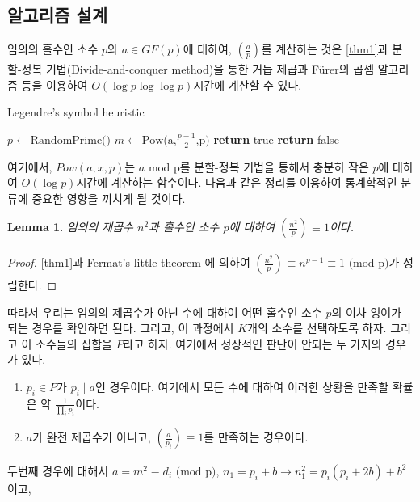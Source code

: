 \documentclass[a4paper]{article}
\newcommand{\Leg}[3][]{\left(\frac{#2}{#3}\right)_{#1}}
\newtheorem{lemma}{Lemma}
\begin{document}
    \subsection{알고리즘 설계}
        임의의 홀수인 소수 $p$와 $a \in GF(p)$에 대하여, $\Leg{a}{p}$를 계산하는 것은 \cref{thm1}과 분할-정복 기법(Divide-and-conquer method)을 통한 거듭 제곱과 Fürer의 곱셈 알고리즘 등을 이용하여 $O(\log{p}\log{\log{p}})$시간에 계산할 수 있다.
        \begin{algorithm}
            \caption{Legendre's symbol heuristic}\label{algo1}
            \begin{algorithmic}
                \State $p \gets \text{RandomPrime()}$
                \State $m \gets \text{Pow(a,$\frac{p-1}{2}$,p)}$
                    \State \textbf{return} true
                \Else
                    \State \textbf{return} false
                \EndIf
            \end{algorithmic}
        \end{algorithm}
        여기에서, $Pow(a,x,p)$는 $a \text{ mod p}$를 분할-정복 기법을 통해서 충분히 작은 $p$에 대하여 $O(\log{p})$시간에 계산하는 함수이다.
        다음과 같은 정리를 이용하여 통계학적인 분류에 중요한 영향을 끼치게 될 것이다.
        \begin{lemma}
            임의의 제곱수 $n^{2}$과 홀수인 소수 $p$에 대하여 $\Leg{n^{2}}{p} \equiv 1$이다.
        \end{lemma}
        \begin{proof}
            \cref{thm1}과 Fermat's little theorem \cite{hardy_heath-brown_wright_2011}에 의하여 $\Leg{n^{2}}{p}\equiv n^{p-1} \equiv 1 \text{ (mod p)}$가 성립한다.
        \end{proof}
        따라서 우리는 임의의 제곱수가 아닌 수에 대하여 어떤 홀수인 소수 $p$의 이차 잉여가 되는 경우를 확인하면 된다.
        그리고, 이 과정에서 $K$개의 소수를 선택하도록 하자.
        그리고 이 소수들의 집합을 $P$라고 하자.
        여기에서 정상적인 판단이 안되는 두 가지의 경우가 있다.
        \begin{enumerate}
            \item $p_{i} \in P$가 $p_{i} \mid a$인 경우이다. 여기에서 모든 수에 대하여 이러한 상황을 만족할 확률은 약 $\frac{1}{\prod\nolimits_{i} p_{i}}$이다.
            \item $a$가 완전 제곱수가 아니고, $\Leg{a}{p_{i}} \equiv 1$를 만족하는 경우이다.
        \end{enumerate}
        두번째 경우에 대해서 $a = m^{2} \equiv d_{i} \text{ (mod p)}$, $n_{1} = p_{i} + b \rightarrow n_{1}^{2}=p_{i}(p_{i} + 2b) + b^{2}$이고,
\end{document}
